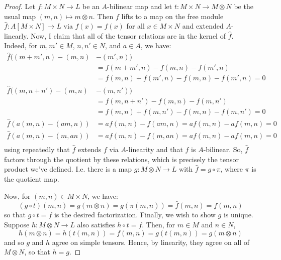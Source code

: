 \documentclass[12pt]{exam}
\begin{document}
\begin{proof}
	Let $f : M \times N \to L$ be an $A$-bilinear map and let $t : M \times N \to M \otimes N$ be the usual map $(m,n) \mapsto m \otimes n$. Then $f$ lifts to a map on the free module $\widehat{f} : A[M \times N] \to L$ via $\widehat{f}(x) = f(x)$ for all $x \in M \times N$ and extended $A$-linearly. Now, I claim that all of the tensor relations are in the kernel of $\widehat{f}$. Indeed, for $m,m' \in M$, $n,n' \in N$, and $a \in A$, we have:
	\begin{align*}
		\widehat{f}((m+m',n)-(m,n) &- (m',n)) \\
			&= f(m+m',n) - f(m,n) - f(m',n) \\
			&= f(m,n)+f(m',n)-f(m,n)-f(m',n) = 0 \\
		\widehat{f}((m,n+n')-(m,n) &- (m,n')) \\
			&= f(m,n+n') - f(m,n) - f(m,n') \\
			&= f(m,n)+f(m,n')-f(m,n)-f(m,n') = 0 \\
		\widehat{f}(a(m,n)-(am,n)) &= af(m,n) - f(am,n) = af(m,n) - af(m,n) = 0 \\
		\widehat{f}(a(m,n)-(m,an)) &= af(m,n) - f(m,an) = af(m,n) - af(m,n) = 0 \\
	\end{align*}
	using repeatedly that $\widehat{f}$ extends $f$ via $A$-linearity and that $f$ is $A$-bilinear. So, $\widehat{f}$ factors through the quotient by these relations, which is precisely the tensor product we've defined. I.e. there is a map $g : M \otimes N \to L$ with $\widehat{f} = g \circ \pi$, where $\pi$ is the quotient map.
	
	Now, for $(m,n) \in M \times N$, we have:
	\[ (g \circ t)(m,n) = g(m \otimes n) = g(\pi(m,n)) = \widehat{f}(m,n) = f(m,n) \]
	so that $g \circ t = f$ is the desired factorization. Finally, we wish to show $g$ is unique. Suppose $h : M \otimes N \to L$ also satisfies $h \circ t = f$. Then, for $m \in M$ and $n \in N$,
	\[ h(m \otimes n) = h(t(m,n)) = f(m,n) = g(t(m,n)) = g(m \otimes n) \]
	and so $g$ and $h$ agree on simple tensors. Hence, by linearity, they agree on all of $M \otimes N$, so that $h = g$.
\end{proof}
\end{document}
